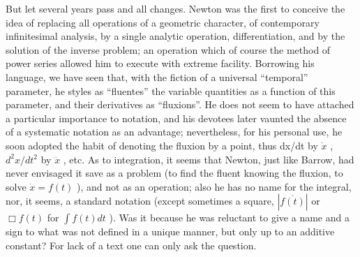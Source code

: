 But let several years pass and all changes. Newton was the first to conceive the idea of replacing all operations of a geometric character, of contemporary infinitesimal analysis, by a single analytic operation, differentiation, and by the solution of the inverse problem; an operation which of course the method of power series allowed him to execute with extreme facility. Borrowing his language, we have seen that, with the fiction of a universal ``temporal'' parameter, he styles as ``fluentes'' the variable quantities as a function of this parameter, and their derivatives as ``fluxions''. He does not seem to have attached a particular importance to notation, and his devotees later vaunted the absence of a systematic notation as an advantage; nevertheless, for his personal use, he soon adopted the habit of denoting the fluxion by a point, thus dx/dt by \(\dot{x}\) , \(d^{2}x/dt^{2}\) by \(\ddot{x}\) , etc. As to integration, it seems that Newton, just like Barrow, had never envisaged it save as a problem (to find the fluent knowing the fluxion, to solve \(\dot{x}=f(t)\) ), and not as an operation; also he has no name for the integral, nor, it seems, a standard notation (except sometimes a square, \(\left|\overline{f(t)}\right|\) or \(\Box f(t)\) for \(\int f(t)dt\) ). Was it because he was reluctant to give a name and a sign to what was not defined in a unique manner, but only up to an additive constant? For lack of a text one can only ask the question.

